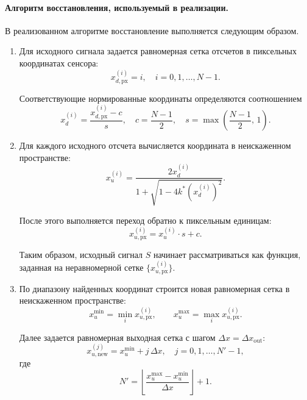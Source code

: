 \paragraph{Алгоритм восстановления, используемый в реализации.}

В реализованном алгоритме восстановление выполняется следующим образом.

\begin{enumerate}
\item Для исходного сигнала задается равномерная сетка отсчетов в пиксельных координатах сенсора:
\begin{equation}
x_{d,\mathrm{px}}^{(i)} = i, \quad i = 0,1,\ldots,N-1.
\label{eq:restore_sensor_grid}
\end{equation}

Соответствующие нормированные координаты определяются соотношением
\begin{equation}
x_d^{(i)} = \frac{x_{d,\mathrm{px}}^{(i)} - c}{s},
\quad
c = \frac{N-1}{2}, \quad s = \max\left(\frac{N-1}{2},\,1\right).
\label{eq:restore_sensor_norm}
\end{equation}

\item Для каждого исходного отсчета вычисляется координата в неискаженном пространстве:
\begin{equation}
x_u^{(i)} =
\frac{2x_d^{(i)}}{1 + \sqrt{1 - 4k^*\left(x_d^{(i)}\right)^2}}.
\label{eq:restore_inverse_main}
\end{equation}

После этого выполняется переход обратно к пиксельным единицам:
\begin{equation}
x_{u,\mathrm{px}}^{(i)} = x_u^{(i)} \cdot s + c.
\label{eq:restore_inverse_px}
\end{equation}

Таким образом, исходный сигнал $S$ начинает рассматриваться как функция, заданная на неравномерной сетке $\{x_{u,\mathrm{px}}^{(i)}\}$.

\item По диапазону найденных координат строится новая равномерная сетка в неискаженном пространстве:
\begin{equation}
x_u^{\min} = \min_i x_{u,\mathrm{px}}^{(i)}, \qquad
x_u^{\max} = \max_i x_{u,\mathrm{px}}^{(i)}.
\label{eq:restore_bounds_current}
\end{equation}

Далее задается равномерная выходная сетка с шагом $\Delta x = \Delta x_{\mathrm{out}}$:
\begin{equation}
x_{u,\mathrm{new}}^{(j)} = x_u^{\min} + j\,\Delta x,
\quad
j = 0,1,\ldots,N'-1,
\label{eq:restore_uniform_grid}
\end{equation}
где
\begin{equation}
N' = \left\lfloor \frac{x_u^{\max} - x_u^{\min}}{\Delta x} \right\rfloor + 1.
\label{eq:restore_size}
\end{equation}


\end{enumerate}

